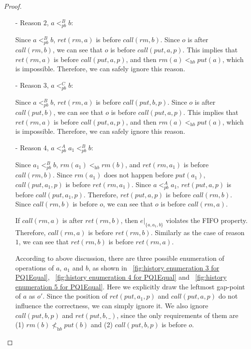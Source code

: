 \begin {proof}
\begin{itemize}
\item[-] Reason $2$, $a <_{\textit{pb}}^B b$:

    Since $a <_{\textit{pb}}^B b$, $\textit{ret}(\textit{rm},a)$ is before $\textit{call}(\textit{rm},b)$. Since $o$ is after $\textit{call}(\textit{rm},b)$, we can see that $o$ is before $\textit{call}(\textit{put},a,p)$. This implies that $\textit{ret}(\textit{rm},a)$ is before $\textit{call}(\textit{put},a,p)$, and then $\textit{rm}(a) <_{\textit{hb}} \textit{put}(a)$, which is impossible. Therefore, we can safely ignore this reason.

\item[-] Reason $3$, $a <_{\textit{pb}}^C b$:

    Since $a <_{\textit{pb}}^B b$, $\textit{ret}(\textit{rm},a)$ is before $\textit{call}(\textit{put},b,p)$. Since $o$ is after $\textit{call}(\textit{put},b)$, we can see that $o$ is before $\textit{call}(\textit{put},a,p)$. This implies that $\textit{ret}(\textit{rm},a)$ is before $\textit{call}(\textit{put},a,p)$, and then $\textit{rm}(a) <_{\textit{hb}} \textit{put}(a)$, which is impossible. Therefore, we can safely ignore this reason.

\item[-] Reason $4$, $a <_{\textit{pb}}^A a_1 <_{\textit{pb}}^B b$:

    Since $a_1 <_{\textit{pb}}^B b$, $\textit{rm}(a_1) <_{\textit{hb}} \textit{rm}(b)$, and $\textit{ret}(\textit{rm},a_1)$ is before $\textit{call}(\textit{rm},b)$. Since $\textit{rm}(a_1)$ does not happen before $\textit{put}(a_1)$, $\textit{call}(\textit{put},a_1,p)$ is before $\textit{ret}(\textit{rm},a_1)$. Since $a <_{\textit{pb}}^A a_1$, $\textit{ret}(\textit{put},a,p)$ is before $\textit{call}(\textit{put},a_1,p)$. Therefore, $\textit{ret}(\textit{put},a,p)$ is before $\textit{call}(\textit{rm},b)$. Since $\textit{call}(\textit{rm},b)$ is before $o$, we can see that $o$ is before $\textit{call}(\textit{rm},a)$.

    If $\textit{call}(\textit{rm},a)$ is after $\textit{ret}(\textit{rm},b)$, then $e \vert_{ \{ a,a_1,b \} }$ violates the FIFO property. Therefore, $\textit{call}(\textit{rm},a)$ is before $\textit{ret}(\textit{rm},b)$. Similarly as the case of reason $1$, we can see that $\textit{ret}(\textit{rm},b)$ is before $\textit{ret}(\textit{rm},a)$.

    According to above discussion, there are three possible enumeration of operations of $a$, $a_1$ and $b$, as shown in \figurename~\ref{fig:history enumeration 3 for PQ1Equal}, \figurename~\ref{fig:history enumeration 4 for PQ1Equal} and \figurename~\ref{fig:history enumeration 5 for PQ1Equal}. Here we explicitly draw the leftmost gap-point of $a$ as $o'$. Since the position of $\textit{ret}(\textit{put},a_1,p)$ and $\textit{call}(\textit{put},a,p)$ do not influence the correctness, we can simply ignore it. We also ignore $\textit{call}(\textit{put},b,p)$ and $\textit{ret}(\textit{put},b,\_)$, since the only requirements of them are (1) $\textit{rm}(b) \not <_{\textit{hb}} \textit{put}(b)$ and (2) $\textit{call}(\textit{put},b,p)$ is before $o$.


\end{itemize}
\end{proof}
